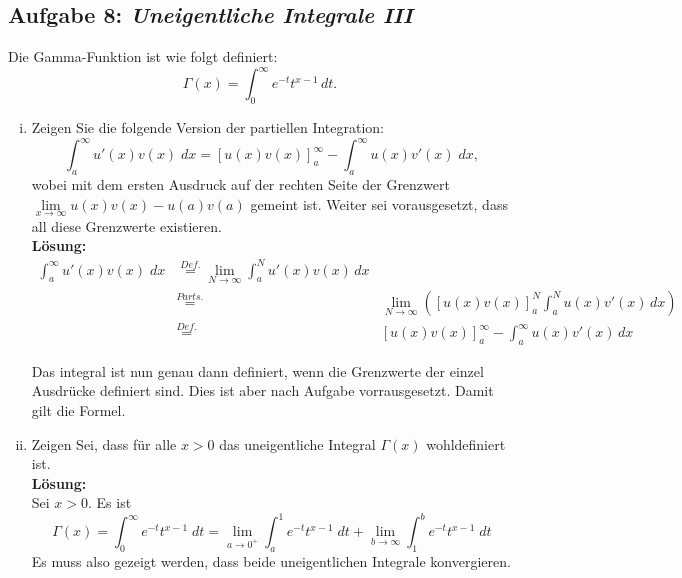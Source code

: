 \documentclass[11pt,a4paper,ngerman]{article}
\begin{document}

\subsection*{Aufgabe 8: \mdseries\itshape Uneigentliche Integrale III}

Die Gamma-Funktion ist wie folgt definiert:
$$
	\Gamma (x) = \int_0^\infty e^{-t}t^{x-1} \, dt.
$$

\begin{enumerate}[(i)]
	\item Zeigen Sie die folgende Version der partiellen Integration:
		$$
			\int_a^\infty u'(x)v(x) \; dx = \left[ u(x)v(x) \right]_a^\infty - \int_a^\infty u(x)v'(x) \; dx,
		$$
		wobei mit dem ersten Ausdruck auf der rechten Seite der Grenzwert \\$\underset{x \rightarrow \infty}{\lim} u(x)v(x) - u(a)v(a)$ gemeint ist. 
		Weiter sei vorausgesetzt, dass all diese Grenzwerte existieren.\\
		
		\textbf{Lösung:}\\
		
		
		$$\begin{array}{rcl}
			\int_a^\infty u'(x)v(x) \; dx &\stackrel{Def.}{=} \underset{N \rightarrow \infty}{\lim} \int_a^N u'(x)v(x) \, dx\\
				&\stackrel{Parts.}{=}& \underset{N \rightarrow \infty}{\lim} \left( \left[ u(x)v(x) \right]_a^N  \int_a^N u(x)v'(x) \, dx \right)\\
				&\stackrel{Def.}{=}& \left[ u(x)v(x) \right]_a^\infty - \int_a^\infty u(x)v'(x) \, dx
		\end{array}$$

		Das integral ist nun genau dann definiert, wenn die Grenzwerte der einzel Ausdrücke definiert sind. Dies ist aber nach Aufgabe vorrausgesetzt. 
		Damit gilt die Formel.
	
	\item Zeigen Sei, dass für alle $x > 0$ das uneigentliche Integral $\Gamma (x)$ wohldefiniert ist.\\
		\textbf{Lösung:}\\
		
		Sei $x>0$. Es ist 
        $$
          \Gamma(x) = \int_{0}^{\infty}{e^{-t} t^{x-1} \; dt} = \lim_{a \to 0^{+}}{\int_{a}^{1}{e^{-t} t^{x-1} \; dt}} + \lim_{b \to \infty}{\int_{1}^{b}{e^{-t} t^{x-1} \; dt}}
        $$
    Es muss also gezeigt werden, dass beide uneigentlichen Integrale  konvergieren.\\


\end{enumerate}
\end{document}
